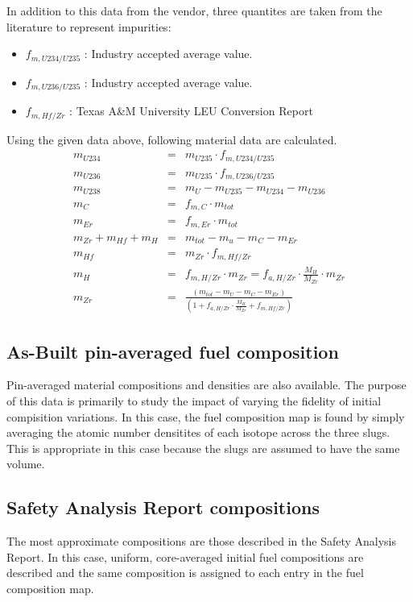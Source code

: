 \documentclass{UWNR_modeling}
\begin{document}
In addition to this data from the vendor, three quantites are taken from the
literature to represent impurities:
\begin{itemize}
\item $f_{m,U234/U235}$ : Industry accepted average value.
\item $f_{m,U236/U235}$ : Industry accepted average value.
\item $f_{m,Hf/Zr}$  : Texas A\&M University LEU Conversion Report \cite{xx}
\end{itemize}

Using the given data above, following material data are calculated.
\begin{eqnarray*}
m_{U234} &=& m_{U235} \cdot f_{m,U234/U235}\\
m_{U236} &=& m_{U235} \cdot f_{m,U236/U235}\\
m_{U238} &=& m_{U} - m_{U235} - m_{U234} - m_{U236}\\
m_{C} &=&  f_{m,C} \cdot m_{tot}\\
m_{Er} &=&  f_{m,Er} \cdot m_{tot}\\
m_{Zr} + m_{Hf} + m_{H} &=& m_{tot} - m_u - m_C - m_{Er}\\
m_{Hf} &=& m_{Zr} \cdot f_{m,Hf/Zr}\\
m_H &=& f_{m,H/Zr} \cdot m_{Zr} = f_{a,H/Zr} \cdot \frac{M_H}{M_{Zr}} \cdot m_{Zr}\\
m_{Zr} &=& \frac{(m_{tot} - m_{U} - m_{C} - m_{Er})}{(1 + f_{a,H/Zr}\cdot \frac{M_{H}}{M_{Zr}} + f_{m,Hf/Zr})}
\end{eqnarray*}

\subsection{As-Built pin-averaged fuel composition}

Pin-averaged material compositions and densities are also available.  The purpose of this data is primarily to study the impact of varying the fidelity of initial compisition variations.  In this case, the fuel composition map is found by simply averaging the atomic number densitites of each isotope across the three slugs.  This is appropriate in this case because the slugs are assumed to have the same volume.

\subsection{Safety Analysis Report compositions}

The most approximate compositions are those described in the Safety Analysis Report.  In this case, uniform, core-averaged initial fuel compositions are described and the same composition is assigned to each entry in the fuel composition map.
\end{document}
